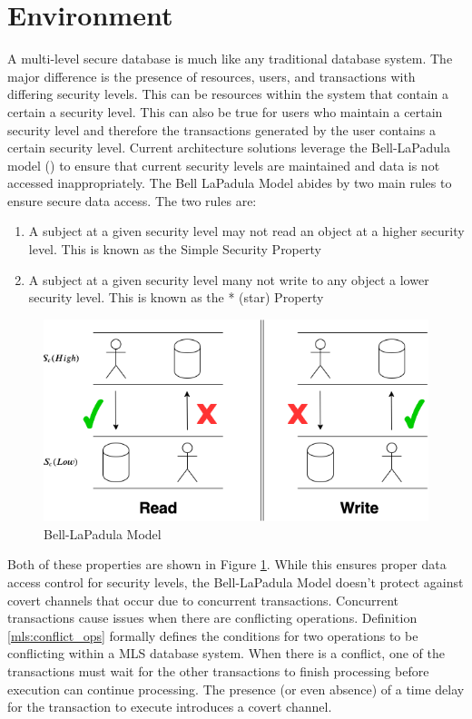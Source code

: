 \section{Environment}
\label{mls:environment}

A multi-level secure database is much like any traditional database system. The major difference is the presence of resources, users, and transactions with differing security levels. This can be resources within the system that contain a certain a security level. This can also be true for users who maintain a certain security level and therefore the transactions generated by the user contains a certain security level. Current architecture solutions leverage the Bell-LaPadula model (\cite{bell_secure_1973}) to ensure that current security levels are maintained and data is not accessed inappropriately. The Bell LaPadula Model abides by two main rules to ensure secure data access. The two rules are:

\begin{enumerate}
  \item A subject at a given security level may not read an object at a higher security level. This is known as the Simple Security Property
  \item A subject at a given security level many not write to any object a lower security level. This is known as the * (star) Property
\end{enumerate}

\begin{figure}
\centering
\includegraphics[scale=0.45]{images/BellLapadulaModel.png}
\caption{Bell-LaPadula Model}
\label{fig:bell_lapadula_model}
\end{figure}

Both of these properties are shown in Figure \ref{fig:bell_lapadula_model}. While this ensures proper data access control for security levels, the Bell-LaPadula Model doesn't protect against covert channels that occur due to concurrent transactions. Concurrent transactions cause issues when there are conflicting operations. Definition \ref{mls:conflict_ops} formally defines the conditions for two operations to be conflicting within a MLS database system.  When there is a conflict, one of the transactions must wait for the other transactions to finish processing before execution can continue processing. The presence (or even absence) of a time delay for the transaction to execute introduces a covert channel. 

